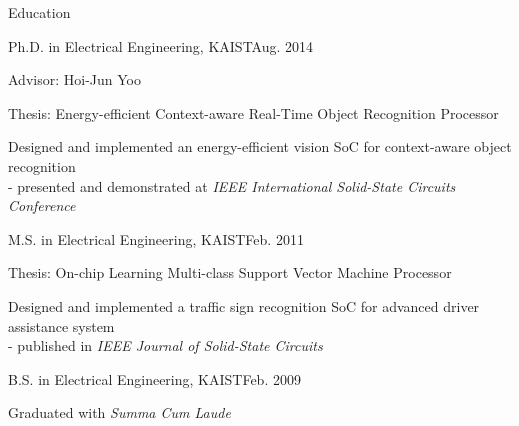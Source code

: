 \documentclass{resume} %
\begin{document}
\begin{section}{Education}

\begin{subsection}{Ph.D. in Electrical Engineering, KAIST}{Aug. 2014}{}{}%
\item Advisor: Hoi-Jun Yoo
\item Thesis: Energy-efficient Context-aware Real-Time Object Recognition Processor
\item Designed and implemented an energy-efficient vision SoC for context-aware object recognition \\
- presented and demonstrated at \emph{IEEE International Solid-State Circuits Conference}
\end{subsection}

\begin{subsection}{M.S. in Electrical Engineering, KAIST}{Feb. 2011}{}{}%
\item Thesis: On-chip Learning Multi-class Support Vector Machine Processor
\item Designed and implemented a traffic sign recognition SoC for advanced driver assistance system \\
- published in \emph{IEEE Journal of Solid-State Circuits}
\end{subsection}

\begin{subsection}{B.S. in Electrical Engineering, KAIST}{Feb. 2009}{}{}
\item Graduated with \emph{Summa Cum Laude}
\end{subsection}

\end{section}
\end{document}
